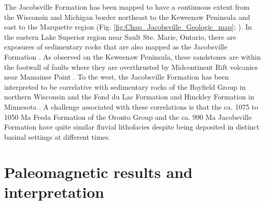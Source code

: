 The Jacobsville Formation has been mapped to have a continuous extent from the Wisconsin and Michigan border northeast to the Keweenaw Peninsula and east to the Marquette region (Fig. \ref{fig:Chap_Jacobsville_Geologic_map}; \cite{Hamblin1958a, Cannon1995a, Cannon1996a, Cannon2001a}). In the eastern Lake Superior region near Sault Ste. Marie, Ontario, there are exposures of sedimentary rocks that are also mapped as the Jacobsville Formation \citep{Hamblin1958a}. As observed on the Keweenaw Peninsula, these sandstones are within the footwall of faults where they are overthrusted by Midcontinent Rift volcanics near Mamainse Point \citep{Manson1994a}. To the west, the Jacobsville Formation has been interpreted to be correlative with sedimentary rocks of the Bayfield Group in northern Wisconsin and the Fond du Lac Formation and Hinckley Formation in Minnesota \citep{Thwaites1912a, Hamblin1958a, Wallace1971a, Kalliokoski1982a, Ojakangas2001b}. A challenge associated with these correlations is that the ca. 1075 to 1050 Ma Freda Formation of the Oronto Group and the ca. 990 Ma Jacobsville Formation have quite similar fluvial lithofacies despite being deposited in distinct basinal settings at different times.

\section*{Paleomagnetic results and interpretation}

